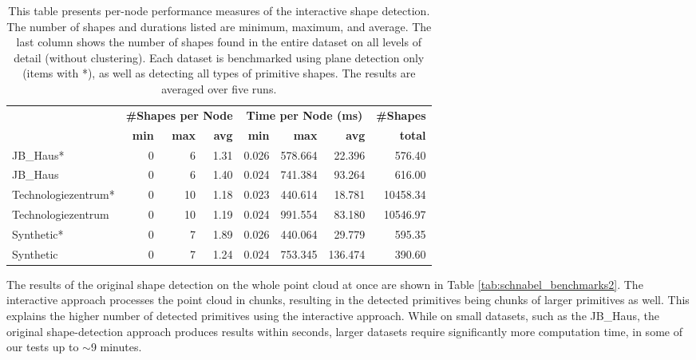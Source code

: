 \begin{table}[h]
    \centering
    \begin{tabular}{ l || r | r | r || r | r | r||r}
            &\multicolumn{3}{c||}{\textbf{\#Shapes per Node}} & \multicolumn{3}{c||}{\textbf{Time per Node (ms) }} & \multicolumn{1}{c}{\textbf{\#Shapes}}\\
            &\textbf{min} & \textbf{max} & \textbf{avg}  & \textbf{min} & \textbf{max} & \textbf{avg} & \textbf{total}  \\
            \hline
            JB\_Haus*           & 0 & 6  & 1.31 & 0.026 & 578.664 &  22.396 &   576.40 \\
            JB\_Haus            & 0 & 6  & 1.40 & 0.024 & 741.384 &  93.264 &   616.00 \\
            Technologiezentrum* & 0 & 10 & 1.18 & 0.023 & 440.614 &  18.781 & 10458.34 \\
            Technologiezentrum  & 0 & 10 & 1.19 & 0.024 & 991.554 &  83.180 & 10546.97 \\
            Synthetic*          & 0 & 7  & 1.89 & 0.026 & 440.064 &  29.779 &   595.35 \\
            Synthetic           & 0 & 7  & 1.24 & 0.024 & 753.345 & 136.474 &   390.60 \\
        \end{tabular}
    \caption[Interactive shape detection performance measures for different datasets]
        {This table presents per-node performance measures of the interactive shape detection. The number of shapes and durations listed are minimum, maximum, and average. The last column shows the number of shapes found in the entire dataset on all levels of detail (without clustering). Each dataset is benchmarked using plane detection only (items with *), as well as detecting all types of primitive shapes. The results are averaged over five runs.}
\label{tab:interactive_schnabel_performance}
\end{table}

The results of the original shape detection on the whole point cloud at once are shown in Table \ref{tab:schnabel_benchmarks2}. The interactive approach processes the point cloud in chunks, resulting in the detected primitives being chunks of larger primitives as well. This explains the higher number of detected primitives using the interactive approach. While on small datasets, such as the JB\_Haus, the original shape-detection approach produces results within seconds, larger datasets require significantly more computation time, in some of our tests up to $\sim$9 minutes. 

